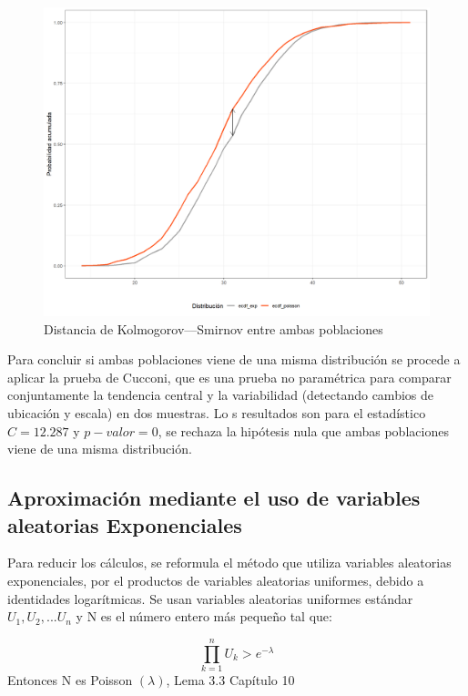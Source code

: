 \documentclass{article}
\begin{document}
\begin{center}
\begin{figure}
\includegraphics[scale=0.6]{figuras/distanciaKolmPE.png}
\caption{Distancia de Kolmogorov–--Smirnov entre ambas poblaciones}
\label{fig:3}
\end{figure}
\end{center}
 Para concluir si ambas poblaciones viene de una misma distribución se procede a aplicar la prueba de Cucconi, que es una prueba no paramétrica para comparar conjuntamente la tendencia central y la variabilidad (detectando cambios de ubicación y escala) en dos muestras. Lo s resultados son para el estadístico $C = 12.287$ y $p-valor = 0$, se rechaza la hipótesis nula que ambas poblaciones viene de una misma distribución.

\subsection{Aproximación mediante el uso de variables aleatorias Exponenciales}

Para reducir los cálculos, se reformula el método que utiliza variables aleatorias exponenciales, por el productos de variables aleatorias uniformes, debido a identidades logarítmicas. Se usan variables aleatorias uniformes estándar $U_{1}, U_{2},...U_{n}$ y N es el número entero más pequeño tal que: 

 \begin{equation}
    \prod_{k=1}^{n}U_{k} >e^{-\lambda} 
\end{equation}
Entonces N es Poisson $(\lambda)$, Lema 3.3 Capítulo 10 \cite{expvar} 
\end{document}
